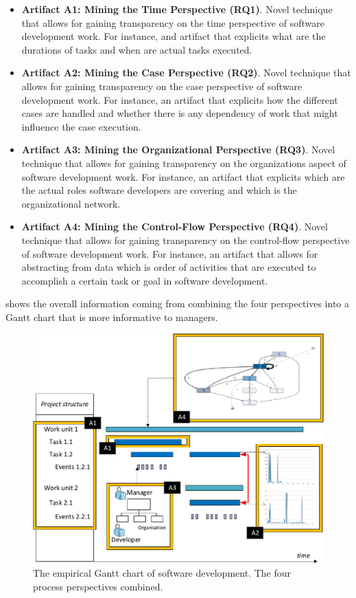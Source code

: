 \documentclass[a4paper,11pt]{article}
\begin{document}
\begin{itemize}	
	\item \textbf{Artifact A1: Mining the Time Perspective (RQ1)}. Novel technique that allows for gaining transparency on the time perspective of software development work.	For instance, and artifact that explicits what are the durations of tasks and when are actual tasks executed.
	
	\item \textbf{Artifact A2: Mining the Case Perspective (RQ2)}. Novel technique that allows for gaining transparency on the case perspective of software development work. For instance, an artifact that explicits how the different cases are handled and whether there is any dependency of work that might influence the case execution. 
	
	\item \textbf{Artifact A3: Mining the Organizational Perspective (RQ3)}. Novel technique that allows for gaining transparency on the organizations aspect of software development work. For instance, an artifact that explicits which are the actual roles software developers are covering and which is the organizational network. 
	
	\item \textbf{Artifact A4: Mining the Control-Flow Perspective (RQ4)}. Novel technique that allows for gaining transparency on the control-flow perspective of software development work. For instance, an artifact that allows for abstracting from data which is order of activities that are executed to accomplish a certain task or goal in software development.	
\end{itemize}

 shows the overall information coming from combining the four perspectives into a Gantt chart that is more informative to managers. 

\begin{figure}[]
	\centering
	\includegraphics[width=\linewidth]{figures/big-solution2-crop.pdf}
	\caption{The empirical Gantt chart of software development. The four process perspectives combined.}
	\label{fig:big-solution}
\end{figure}
\end{document}
